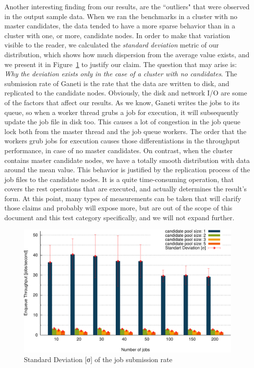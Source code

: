 Another interesting finding from our results, are the ``outliers" that were
observed in the output sample data. When we ran the benchmarks in a cluster with
no master candidates, the data tended to have a more sparse behavior than in a
cluster with one, or more, candidate nodes. In order to make that variation
visible to the reader, we calculated the \emph{standard deviation} metric of our
distribution, which shows how much dispersion from the average value exists, and
we present it in Figure~\ref{fig:std} to justify our claim. The question that
may arise is: \emph{Why the deviation exists only in the case of a cluster with
no candidates}. The submission rate of Ganeti is the rate that the data are
written to disk, and replicated to the candidate nodes. Obviously, the disk and
network I/O are some of the factors that affect our results. As we know, Ganeti
writes the jobs to its queue, so when a worker thread grubs a job for execution,
it will subsequently update the job file in disk too. This causes
a lot of congestion in the job queue lock both from the master thread and the
job queue workers. The order that the workers grub jobs for execution causes
those differentiations in the throughput performance, in case of
no master candidates. On contrast, when the cluster contains master candidate
nodes, we have a totally smooth distribution with data around the mean value.
This behavior is justified by the replication process of the job files to the
candidate nodes. It is a quite time-consuming operation, that covers the
rest operations that are executed, and actually determines the result's form. At
this point, many types of measurements can be taken that will clarify those
claims and probably will expose more, but are out of the scope of this document
and this test category specifically, and we will not expand further.

\begin{figure}[htbp]
  \begin{center}
    \includegraphics[width=1.0\maxwidth]{../figures/std.pdf}
    \caption{Standard Deviation [σ] of the job submission rate}
    \label{fig:std}
  \end{center}
\end{figure}


